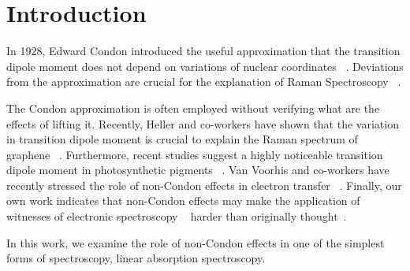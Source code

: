 \section{Introduction}
In 1928, Edward Condon introduced the useful approximation that the transition dipole moment does not depend on variations of nuclear coordinates ~\cite{Condon}. Deviations from the approximation are crucial for the explanation of Raman Spectroscopy ~\cite{ResonanceRaman}.

The Condon approximation is often employed without verifying what are the effects of lifting it. Recently, Heller and co-workers have shown that the variation in transition dipole moment is crucial to explain the Raman spectrum of graphene ~\cite{hellerGraphene}.  Furthermore, recent studies suggest a highly noticeable transition dipole moment in photosynthetic pigments ~\cite{photosyntheticKappa}.  Van Voorhis and co-workers have recently stressed the role of non-Condon effects in electron transfer ~\cite{MavrosNonCondon}.  Finally, our own work indicates that non-Condon effects may make the application of witnesses of electronic spectroscopy ~\cite{witness,allanWitness} harder than originally thought~\cite{myWitnessPaper}.

In this work, we examine the role of non-Condon effects in one of the simplest forms of spectroscopy, linear absorption spectroscopy.

